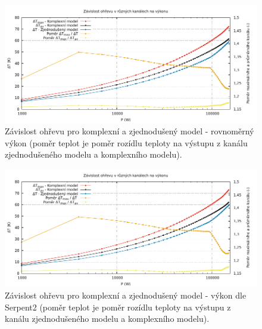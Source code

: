 \begin{figure}[H]
	\centering
	\includegraphics[width=\textwidth]{./04_TH_model_IRT/grafy/ohrev_rovn.pdf}
	\caption{Závislost ohřevu pro komplexní a zjednodušený model - rovnoměrný výkon (poměr teplot je poměr rozídlu teploty na výstupu z kanálu zjednodušeného modelu a komplexního modelu).}
	\label{fig:ohrev_vykon_rovn}
\end{figure}
\begin{figure}[H]
	\centering
	\includegraphics[width=\textwidth]{./04_TH_model_IRT/grafy/ohrev_serpent.pdf}
	\caption{Závislost ohřevu pro komplexní a zjednodušený model - výkon dle Serpent2 (poměr teplot je poměr rozídlu teploty na výstupu z kanálu zjednodušeného modelu a komplexního modelu).}
	\label{fig:ohrev_vykon_serpent}
\end{figure}

